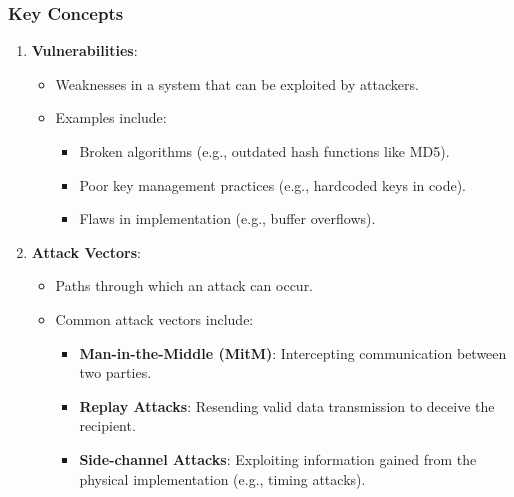 \documentclass{beamer}
\begin{document}
\begin{frame}
    \frametitle{Key Concepts}
    \begin{enumerate}
        \item \textbf{Vulnerabilities}:
        \begin{itemize}
            \item Weaknesses in a system that can be exploited by attackers.
            \item Examples include:
            \begin{itemize}
                \item Broken algorithms (e.g., outdated hash functions like MD5).
                \item Poor key management practices (e.g., hardcoded keys in code).
                \item Flaws in implementation (e.g., buffer overflows).
            \end{itemize}
        \end{itemize}

        \item \textbf{Attack Vectors}:
        \begin{itemize}
            \item Paths through which an attack can occur.
            \item Common attack vectors include:
            \begin{itemize}
                \item \textbf{Man-in-the-Middle (MitM)}: Intercepting communication between two parties.
                \item \textbf{Replay Attacks}: Resending valid data transmission to deceive the recipient.
                \item \textbf{Side-channel Attacks}: Exploiting information gained from the physical implementation (e.g., timing attacks).
            \end{itemize}
        \end{itemize}
    \end{enumerate}
\end{frame}
\end{document}
